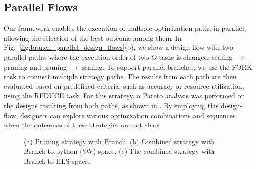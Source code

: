 \subsection{Parallel Flows}
\label{sec:parallel_flow}
Our framework enables the execution of multiple optimization paths in parallel, allowing the selection of the best outcome among them. In Fig.~\ref{fig:branch_parallel_design_flows}(b), we show a design-flow with two parallel paths, where the execution order of two $O$-tasks is changed: scaling $\rightarrow$ pruning and pruning $\rightarrow$ scaling. To support parallel branches, we use the FORK task to connect multiple strategy paths. The results from each path are then evaluated based on predefined criteria, such as accuracy or resource utilization, using the REDUCE task. For this strategy, a Pareto analysis was performed on the designs resulting from both paths, as shown in . By employing this design-flow, designers can explore various optimization combinations and sequences when the outcomes of these strategies are not clear.



% 
\begin{figure} 
   \centering
   \hspace*{\fill}
   \hspace*{\fill}
  \hspace*{\fill}
 \hspace*{\fill}
  \caption{(a) Pruning strategy with Branch. (b) Combined strategy with Branch to python (SW) space. (c) The combined strategy with Branch to HLS space. }
  \label{fig:bottom_up_design_flow} 
\end{figure}


